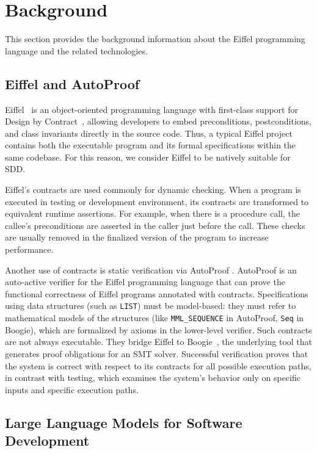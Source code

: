 \documentclass[runningheads]{llncs}
\begin{document}
\section{Background}\label{background}
This section provides the background information about the Eiffel programming
language and the related technologies.

\subsection{Eiffel and AutoProof}\label{eiffel-and-autoproof}

Eiffel~\cite{eiffel_language_and_environment} is an object-oriented programming language with first-class support for Design by Contract~\cite{design-by-contract}, allowing developers to embed preconditions, postconditions, and class invariants directly in the source code. Thus, a typical Eiffel project contains both the executable program and its formal specifications within the same codebase. For this reason, we consider Eiffel to be natively suitable for SDD.

Eiffel's contracts are used commonly for dynamic checking. When a program is executed in testing or development environment, its contracts are transformed to equivalent runtime assertions. For example, when there is a procedure call, the callee's preconditions are asserted in the caller just before the call. These checks are usually removed in the finalized version of the program to increase performance.

Another use of contracts is static verification via AutoProof \cite{autoproof}. AutoProof is an auto-active verifier for the Eiffel programming language that can prove the functional correctness of Eiffel programs annotated with contracts.
Specifications using data structures (such as \lstinline|LIST|) must be model-based: they must refer to mathematical models
of the structures (like \lstinline|MML_SEQUENCE| in AutoProof, \texttt{Seq} in Boogie),
which are formalized by axioms in the lower-level verifier. Such contracts are not always executable. They bridge Eiffel to Boogie~\cite{boogie-lang}, the underlying tool that generates proof obligations for an SMT solver.
Successful verification proves that the system is correct
with respect to its contracts for all possible execution paths,
in contrast with testing, which examines the system's behavior only on specific inputs and specific execution paths.

\subsection{Large Language Models for Software Development}\label{llm}
\end{document}
